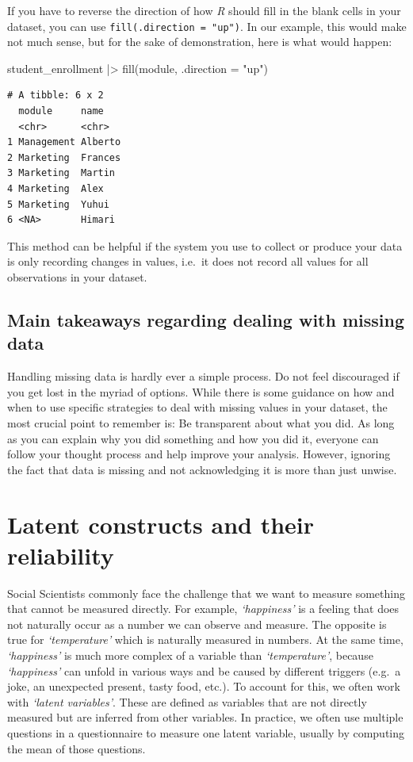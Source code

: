 \documentclass[
  letterpaper,
]{krantz}
\makeatletter
\newenvironment{Shaded}{\begin{snugshade}}{\end{snugshade}}
\newcommand{\AttributeTok}[1]{\textcolor[rgb]{0.40,0.45,0.13}{#1}}
\newcommand{\FunctionTok}[1]{\textcolor[rgb]{0.28,0.35,0.67}{#1}}
\newcommand{\NormalTok}[1]{\textcolor[rgb]{0.00,0.23,0.31}{#1}}
\newcommand{\SpecialCharTok}[1]{\textcolor[rgb]{0.37,0.37,0.37}{#1}}
\newcommand{\StringTok}[1]{\textcolor[rgb]{0.13,0.47,0.30}{#1}}
\newenvironment{kframe}{%
\medskip{}
\setlength{\fboxsep}{.8em}
 \def\at@end@of@kframe{}%
 \ifinner\ifhmode%
  \def\at@end@of@kframe{\end{minipage}}%
  \begin{minipage}{\columnwidth}%
 \fi\fi%
 \def\FrameCommand##1{\hskip\@totalleftmargin \hskip-\fboxsep
 \colorbox{shadecolor}{##1}\hskip-\fboxsep
     \hskip-\linewidth \hskip-\@totalleftmargin \hskip\columnwidth}%
 \MakeFramed {\advance\hsize-\width
   \@totalleftmargin\z@ \linewidth\hsize
   \@setminipage}}%
 {\par\unskip\endMakeFramed%
 \at@end@of@kframe}
\renewenvironment{Shaded}{\begin{kframe}}{\end{kframe}}
\makeatother
\begin{document}
If you have to reverse the direction of how \emph{R} should fill in the
blank cells in your dataset, you can use
\texttt{fill(.direction\ =\ "up")}. In our example, this would make not
much sense, but for the sake of demonstration, here is what would
happen:

\begin{Shaded}
\begin{Highlighting}[]
\NormalTok{student\_enrollment }\SpecialCharTok{|\textgreater{}} \FunctionTok{fill}\NormalTok{(module, }\AttributeTok{.direction =} \StringTok{"up"}\NormalTok{)}
\end{Highlighting}
\end{Shaded}

\begin{verbatim}
# A tibble: 6 x 2
  module     name   
  <chr>      <chr>  
1 Management Alberto
2 Marketing  Frances
3 Marketing  Martin 
4 Marketing  Alex   
5 Marketing  Yuhui  
6 <NA>       Himari 
\end{verbatim}

This method can be helpful if the system you use to collect or produce
your data is only recording changes in values, i.e.~it does not record
all values for all observations in your dataset.

\subsection{Main takeaways regarding dealing with missing
data}\label{sec-main-takeaways-missing-data}

Handling missing data is hardly ever a simple process. Do not feel
discouraged if you get lost in the myriad of options. While there is
some guidance on how and when to use specific strategies to deal with
missing values in your dataset, the most crucial point to remember is:
Be transparent about what you did. As long as you can explain why you
did something and how you did it, everyone can follow your thought
process and help improve your analysis. However, ignoring the fact that
data is missing and not acknowledging it is more than just unwise.

\section{Latent constructs and their
reliability}\label{sec-latent-constructs}

Social Scientists commonly face the challenge that we want to measure
something that cannot be measured directly. For example,
\emph{`happiness'} is a feeling that does not naturally occur as a
number we can observe and measure. The opposite is true for
\emph{`temperature'} which is naturally measured in numbers. At the same
time, \emph{`happiness'} is much more complex of a variable than
\emph{`temperature'}, because \emph{`happiness'} can unfold in various
ways and be caused by different triggers (e.g.~a joke, an unexpected
present, tasty food, etc.). To account for this, we often work with
\emph{`latent variables'}. These are defined as variables that are not
directly measured but are inferred from other variables. In practice, we
often use multiple questions in a questionnaire to measure one latent
variable, usually by computing the mean of those questions.
\end{document}
